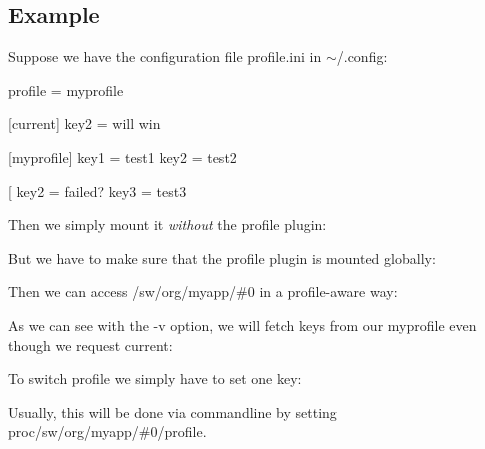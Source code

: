 \subsection*{Example}

Suppose we have the configuration file {\ttfamily profile.\+ini} in {\ttfamily $\sim$/.config}\+: \begin{DoxyVerb}%
[]
profile = myprofile

[current]
key2 = will win

[myprofile]
key1 = test1
key2 = test2

[%
key2 = failed?
key3 = test3
\end{DoxyVerb}


Then we simply mount it {\itshape without} the profile plugin\+: \begin{DoxyVerb}%
\end{DoxyVerb}


But we have to make sure that the profile plugin is mounted globally\+: \begin{DoxyVerb}%
\end{DoxyVerb}


Then we can access {\ttfamily /sw/org/myapp/\#0} in a profile-\/aware way\+: 


As we can see with the {\ttfamily -\/v} option, we will fetch keys from our {\ttfamily myprofile} even though we request {\ttfamily current}\+: 


To switch profile we simply have to set one key\+: 


Usually, this will be done via commandline by setting {\ttfamily proc/sw/org/myapp/\#0/profile}. 